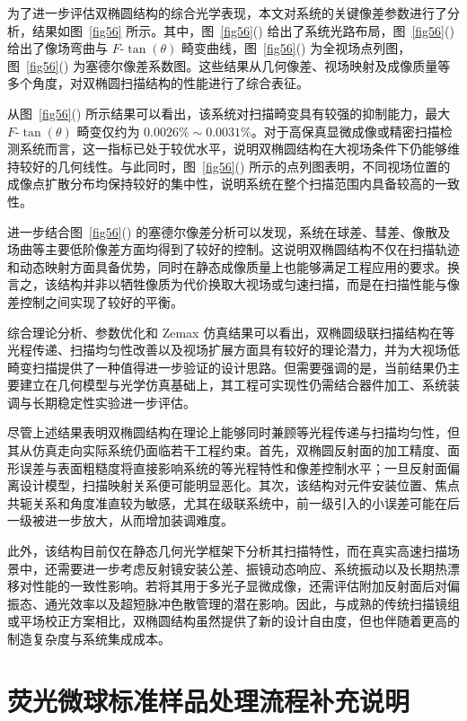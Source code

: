 为了进一步评估双椭圆结构的综合光学表现，本文对系统的关键像差参数进行了分析，结果如图~\ref{fig56} 所示。其中，图~\ref{fig56}() 给出了系统光路布局，图~\ref{fig56}() 给出了像场弯曲与 $F$-$\tan(\theta)$ 畸变曲线，图~\ref{fig56}() 为全视场点列图，图~\ref{fig56}() 为塞德尔像差系数图。这些结果从几何像差、视场映射及成像质量等多个角度，对双椭圆扫描结构的性能进行了综合表征。

从图~\ref{fig56}() 所示结果可以看出，该系统对扫描畸变具有较强的抑制能力，最大 $F$-$\tan(\theta)$ 畸变仅约为 $0.0026\%\sim0.0031\%$。对于高保真显微成像或精密扫描检测系统而言，这一指标已处于较优水平，说明双椭圆结构在大视场条件下仍能够维持较好的几何线性。与此同时，图~\ref{fig56}() 所示的点列图表明，不同视场位置的成像点扩散分布均保持较好的集中性，说明系统在整个扫描范围内具备较高的一致性。

进一步结合图~\ref{fig56}() 的塞德尔像差分析可以发现，系统在球差、彗差、像散及场曲等主要低阶像差方面均得到了较好的控制。这说明双椭圆结构不仅在扫描轨迹和动态映射方面具备优势，同时在静态成像质量上也能够满足工程应用的要求。换言之，该结构并非以牺牲像质为代价换取大视场或匀速扫描，而是在扫描性能与像差控制之间实现了较好的平衡。

综合理论分析、参数优化和 Zemax 仿真结果可以看出，双椭圆级联扫描结构在等光程传递、扫描均匀性改善以及视场扩展方面具有较好的理论潜力，并为大视场低畸变扫描提供了一种值得进一步验证的设计思路。但需要强调的是，当前结果仍主要建立在几何模型与光学仿真基础上，其工程可实现性仍需结合器件加工、系统装调与长期稳定性实验进一步评估。

尽管上述结果表明双椭圆结构在理论上能够同时兼顾等光程传递与扫描均匀性，但其从仿真走向实际系统仍面临若干工程约束。首先，双椭圆反射面的加工精度、面形误差与表面粗糙度将直接影响系统的等光程特性和像差控制水平；一旦反射面偏离设计模型，扫描映射关系便可能明显恶化。其次，该结构对元件安装位置、焦点共轭关系和角度准直较为敏感，尤其在级联系统中，前一级引入的小误差可能在后一级被进一步放大，从而增加装调难度。

此外，该结构目前仅在静态几何光学框架下分析其扫描特性，而在真实高速扫描场景中，还需要进一步考虑反射镜安装公差、振镜动态响应、系统振动以及长期热漂移对性能的一致性影响。若将其用于多光子显微成像，还需评估附加反射面后对偏振态、通光效率以及超短脉冲色散管理的潜在影响。因此，与成熟的传统扫描镜组或平场校正方案相比，双椭圆结构虽然提供了新的设计自由度，但也伴随着更高的制造复杂度与系统集成成本。




\chapter{荧光微球标准样品处理流程补充说明}\label{app:beads_protocol}

